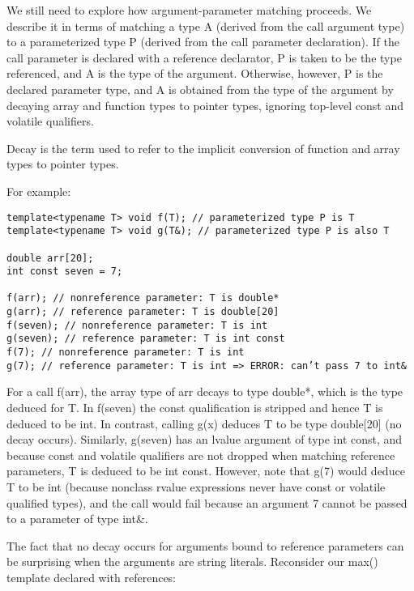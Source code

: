 We still need to explore how argument-parameter matching proceeds. We describe it in terms of matching a type A (derived from the call argument type) to a parameterized type P (derived from the call parameter declaration). If the call parameter is declared with a reference declarator, P is taken to be the type referenced, and A is the type of the argument. Otherwise, however, P is the declared parameter type, and A is obtained from the type of the argument by decaying array and function types to pointer types, ignoring top-level const and volatile qualifiers. 

\begin{tcolorbox}[colback=webgreen!5!white,colframe=webgreen!75!black]
\hspace*{0.75cm}Decay is the term used to refer to the implicit conversion of function and array types to pointer types.
\end{tcolorbox}

For example:

\begin{lstlisting}[style=styleCXX]
template<typename T> void f(T); // parameterized type P is T
template<typename T> void g(T&); // parameterized type P is also T

double arr[20];
int const seven = 7;

f(arr); // nonreference parameter: T is double*
g(arr); // reference parameter: T is double[20]
f(seven); // nonreference parameter: T is int
g(seven); // reference parameter: T is int const
f(7); // nonreference parameter: T is int
g(7); // reference parameter: T is int => ERROR: can’t pass 7 to int&
\end{lstlisting} 

For a call f(arr), the array type of arr decays to type double*, which is the type deduced for T. In f(seven) the const qualification is stripped and hence T is deduced to be int. In contrast, calling g(x) deduces T to be type double[20] (no decay occurs). Similarly, g(seven) has an lvalue argument of type int const, and because const and volatile qualifiers are not dropped when matching reference parameters, T is deduced to be int const. However, note that g(7) would deduce T to be int (because nonclass rvalue expressions never have const or volatile qualified types), and the call would fail because an argument 7 cannot be passed to a parameter of type int\&.

The fact that no decay occurs for arguments bound to reference parameters can be surprising when the arguments are string literals. Reconsider our max() template declared with references:

